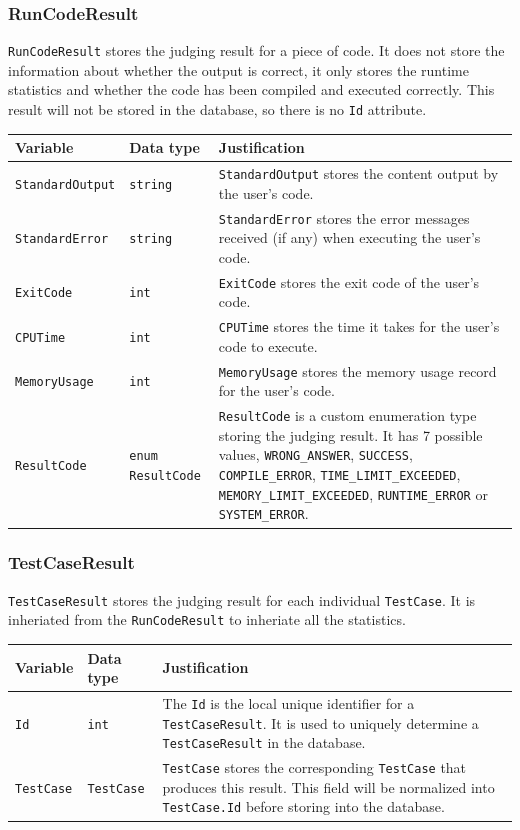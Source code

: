 \documentclass[a4paper]{report}
\begin{document}
\subsubsection{RunCodeResult}

\verb|RunCodeResult| stores the judging result for a piece of code. It does not store the information about whether the output is correct, it only stores the runtime statistics and whether the code has been compiled and executed correctly. This result will not be stored in the database, so there is no \verb|Id| attribute.

\begin{tabulary}{\textwidth}{|l|l|L|}
    \hline
    Variable & Data type & Justification \\
    \hline
    \verb|StandardOutput| & \verb|string| & \verb|StandardOutput| stores the content output by the user's code. \\
    \hline
    \verb|StandardError| & \verb|string| & \verb|StandardError| stores the error messages received (if any) when executing the user's code. \\
    \hline
    \verb|ExitCode| & \verb|int| & \verb|ExitCode| stores the exit code of the user's code. \\
    \hline
    \verb|CPUTime| & \verb|int| & \verb|CPUTime| stores the time it takes for the user's code to execute. \\
    \hline
    \verb|MemoryUsage| & \verb|int| & \verb|MemoryUsage| stores the memory usage record for the user's code. \\
    \hline
    \verb|ResultCode| & \verb|enum ResultCode| & \verb|ResultCode| is a custom enumeration type storing the judging result. It has 7 possible values, \verb|WRONG_ANSWER|, \verb|SUCCESS|, \verb|COMPILE_ERROR|, \verb|TIME_LIMIT_EXCEEDED|, \verb|MEMORY_LIMIT_EXCEEDED|, \verb|RUNTIME_ERROR| or \verb|SYSTEM_ERROR|. \\
    \hline
\end{tabulary}

\subsubsection{TestCaseResult}

\verb|TestCaseResult| stores the judging result for each individual \verb|TestCase|. It is inheriated from the \verb|RunCodeResult| to inheriate all the statistics.

\begin{tabulary}{\textwidth}{|l|l|L|}
    \hline
    Variable & Data type & Justification \\
    \hline
    \verb|Id| & \verb|int| & The \verb|Id| is the local unique identifier for a \verb|TestCaseResult|. It is used to uniquely determine a \verb|TestCaseResult| in the database. \\
    \hline
    \verb|TestCase| & \verb|TestCase| & \verb|TestCase| stores the corresponding \verb|TestCase| that produces this result. This field will be normalized into \verb|TestCase.Id| before storing into the database. \\
    \hline
\end{tabulary}
\end{document}
